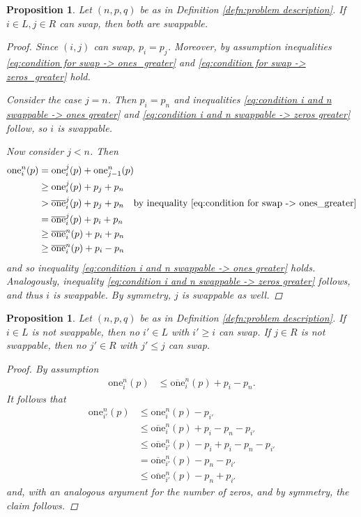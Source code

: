\documentclass[12pt]{article}
\newtheorem{prop}[thm]{Proposition}
\begin{document}
\begin{prop}
Let $(n, p, q)$ be as in Definition \ref{defn:problem description}. If $i\in L, j\in R$ can swap, then both are swappable.
\begin{proof}
Since $(i, j)$ can swap, $p_i=p_j$. Moreover, by assumption inequalities \eqref{eq:condition for swap -> ones_greater} and \eqref{eq:condition for swap -> zeros_greater} hold.

Consider the case $j=n$. Then $p_i=p_n$ and inequalities \eqref{eq:condition i and n swappable -> ones greater} and \eqref{eq:condition i and n swappable -> zeros greater} follow, so $i$ is swappable.

Now consider $j<n$. Then
\begin{align*}
\mathrm{one}_i^{n}(p)
&=
\mathrm{one}_i^{j}(p)
+
\mathrm{one}_{j-1}^{n}(p)
\\
&\geq 
\mathrm{one}_i^{j}(p)
+
p_j+p_n
\\
&>
\overline{\mathrm{one}}_i^{j}(p)
+
p_j+p_n
\quad\textrm{by inequality \eqref{eq:condition for swap -> ones_greater}}
\\
&=
\overline{\mathrm{one}}_i^{j}(p)
+
p_i+p_n
\\
&\geq
\overline{\mathrm{one}}_i^{n}(p)
+
p_i+p_n
\\
&\geq
\overline{\mathrm{one}}_i^{n}(p)
+
p_i-p_n
\end{align*}
and so inequality \eqref{eq:condition i and n swappable -> ones greater} holds. Analogously, inequality \eqref{eq:condition i and n swappable -> zeros greater} follows, and thus $i$ is swappable.
By symmetry, $j$ is swappable as well.
\end{proof} 
\label{prop:if i j can swap, they are swappable}
\end{prop}

\begin{prop}
Let $(n, p, q)$ be as in Definition \ref{defn:problem description}. If $i\in L$ is not swappable, then no $i'\in L$ with $i'\geq i$ can swap. If $j\in R$ is not swappable, then no $j'\in R$ with $j'\leq j$ can swap.
\begin{proof}
By assumption
\begin{align*}
\mathrm{one}_i^{n}(p)
&\leq
\overline{\mathrm{one}}_i^{n}(p)
+
p_i-p_n.
\end{align*}
It follows that
\begin{align*}
\mathrm{one}_{i'}^{n}(p)
&\leq
\mathrm{one}_{i}^{n}(p)
-
p_{i'}
\\
&\leq
\overline{\mathrm{one}}_i^{n}(p)
+
p_i-p_n
-
p_{i'}
\\
&\leq
\overline{\mathrm{one}}_{i'}^{n}(p)
-p_i
+
p_i-p_n
-
p_{i'}
\\
&=
\overline{\mathrm{one}}_{i'}^{n}(p)
-p_n
-
p_{i'}
\\
&\leq
\overline{\mathrm{one}}_{i'}^{n}(p)
-p_n
+
p_{i'}
\end{align*}
and, with an analogous argument for the number of zeros, and by symmetry, the claim follows.
\end{proof}
\label{prop:i not swappable => i'>i not swappable}
\end{prop}
\end{document}
